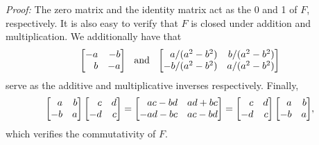 \documentclass[12pt]{article}
\newcommand{\proof}{\textit{Proof: }}
\begin{document}
\proof
The zero matrix and the identity matrix act as the 0 and 1 of \( F \),
respectively.
It is also easy to verify that \( F \) is closed under addition and
multiplication.
We additionally have that
\[
	\begin{bmatrix*}[r]
		-a & -b \\ b & -a
	\end{bmatrix*}
	\hspace{0.1in}\text{and}\hspace{0.1in}
	\begin{bmatrix*}[r]
		a/(a^2 - b^2) & b/(a^2 - b^2) \\
		-b/(a^2 - b^2) & a/(a^2 - b^2)
	\end{bmatrix*}
\]
serve as the additive and multiplicative inverses respectively.
Finally,
\[
	\begin{bmatrix*}[r]
		a & b \\ -b & a
	\end{bmatrix*}
	\begin{bmatrix*}[r]
		c & d \\ -d & c
	\end{bmatrix*}
	= \begin{bmatrix*}[r]
		ac - bd & ad + bc \\ -ad - bc & ac - bd
	\end{bmatrix*}
	= \begin{bmatrix*}[r]
		c & d \\ -d & c
	\end{bmatrix*}
	\begin{bmatrix*}[r]
		a & b \\ -b & a
	\end{bmatrix*}
	\kern-0.025in,
\]
which verifies the commutativity of \( F \).
\end{document}
